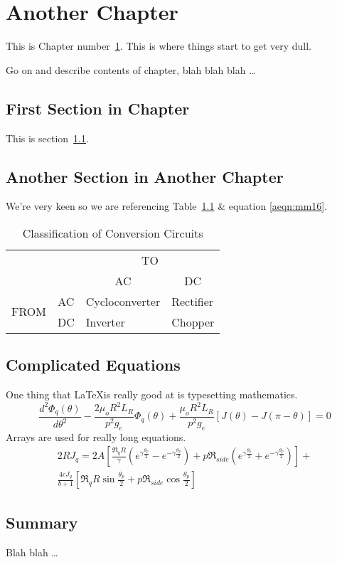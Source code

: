 \chapter{Another Chapter}\label{chap:another}

This is Chapter number~\ref{chap:another}. This is where
things start to get very dull.

Go on and describe contents of chapter, blah blah blah \ldots


\section{First Section in Chapter}\label{another:sec}

This is section~\ref{another:sec}.

\section{Another Section in Another Chapter}

We're very keen so we are referencing Table~\ref{conversion} \& equation \ref{aeqn:mm16}.

\begin{table}[!h]
\centering
\begin{tabular}{l|l|l|l|}
\multicolumn{1}{l}{}&\multicolumn{1}{l}{}&\multicolumn{2}{c}{TO}\\ 
\cline{3-4}
\multicolumn{1}{l}{}&\multicolumn{1}{c|}{}&\multicolumn{1}{c|}{AC}&\multicolumn{1}{c|}{DC}\\ 
\cline{2-4}
\multirow{2}{*}{FROM}&\multicolumn{1}{c|}{AC}&Cycloconverter&Rectifier\\ 
&\multicolumn{1}{c|}{DC}&Inverter&Chopper\\ 
\cline{2-4}
\end{tabular}
\caption[Caption for List of Tables]{Classification of Conversion Circuits}
\label{conversion}
\end{table}

\section{Complicated Equations}

One thing that \LaTeX is really good at is typesetting mathematics.
\begin{equation}
\frac{d^2 \Phi_q(\theta)}{d\theta^2}-\frac{2\mu_o R^2 L_R}{p^2 g_e}\Phi_q(\theta)
+\frac{\mu_o R^2 L_R}{p^2 g_e} \left[J(\theta)-J(\pi-\theta)\right]=0
\label{aeqn:mm16}
\end{equation}
Arrays are used for really long equations.
\begin{eqnarray}
2RJ_q=2A\left[\frac{\Re_qR}{\gamma}(e^{\gamma\frac{\theta_p}{2}}-e^{-\gamma\frac{\theta_p}{2}})
+p\Re_{side}(e^{\gamma\frac{\theta_p}{2}}+e^{-\gamma\frac{\theta_p}{2}})\right]+
\nonumber\\
\frac{4cJ_q}{b+1}\left[\Re_qR\sin\frac{\theta_p}{2}+p\Re_{side}\cos\frac{\theta_p}{2}\right]
\end{eqnarray}


\section{Summary}

Blah blah \ldots
